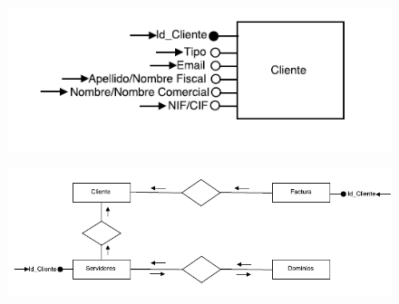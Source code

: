 \documentclass[paper=a4, fontsize=11pt, spanish]{scrartcl}
\begin{document}
\begin{figure}
	\includegraphics[width=1.20\textwidth]{NavModificar.png}
	\caption{}
	\label{fig:NavModificar}
\end{figure}

\begin{figure}
	\includegraphics[width=1.20\textwidth]{NavBorrar.png}
	\caption{}
	\label{fig:NavBorrar}
\end{figure}
\end{document}
